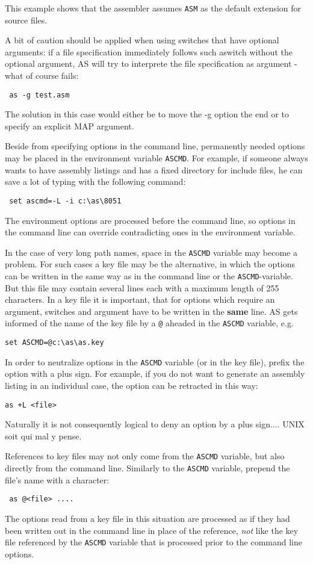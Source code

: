 \documentclass[12pt,twoside]{report}
\newcommand{\bb}[1]{{\bf #1}}
\newcommand{\tty}[1]{{\tt #1}}
\begin{document}
This example shows that the assembler assumes \tty{ASM} as the default
extension for source files.

A bit of caution should be applied when using switches that have
optional arguments: if a file specification immediately follows such
aswitch without the optional argument, AS will try to interprete the
file specification as argument - what of course fails:
\begin{verbatim}
 as -g test.asm
\end{verbatim}
The solution in this case would either be to move the -g option the
end or to specify an explicit MAP argument.


Beside from specifying options in the command line, permanently
needed options may be placed in the environment variable \tty{ASCMD}.  For
example, if someone always wants to have assembly listings and has a
fixed directory for include files, he can save a lot of typing with
the following command:
\begin{verbatim}
 set ascmd=-L -i c:\as\8051
\end{verbatim}
The environment options are processed before the command line,
so options in the command line can override contradicting ones in the
environment variable.

In the case of very long path names, space in the \tty{ASCMD} variable may
become a problem.  For such cases a key file may be the alternative,
in which the options can be written in the same way as in the command
line or the \tty{ASCMD}-variable.  But this file may contain several lines
each with a maximum length of 255 characters.  In a key file it is
important, that for options which require an argument, switches and
argument have to be written in the \bb{same} line.  AS gets informed of
the name of the key file by a \tty{@} aheaded in the \tty{ASCMD} variable,
e.g.
\begin{verbatim}
set ASCMD=@c:\as\as.key
\end{verbatim}
In order to neutralize options in the \tty{ASCMD} variable (or in the
key file), prefix the option with a plus sign.  For example, if you
do not want to generate an assembly listing in an individual case,
the option can be retracted in this way:
\begin{verbatim}
as +L <file>
\end{verbatim}
Naturally it is not consequently logical to deny an option by a
plus sign....  UNIX soit qui mal y pense.

References to key files may not only come from the {\tt ASCMD} variable,
but also directly from the command line.  Similarly to the {\tt ASCMD}
variable, prepend the file's name with a \@ character:
\begin{verbatim}
 as @<file> ....
\end{verbatim}
The options read from a key file in this situation are processed as if
they had been written out in the command line in place of the reference,
{\em not} like the key file referenced by the {\tt ASCMD} variable that is
processed prior to the command line options.
\end{document}

